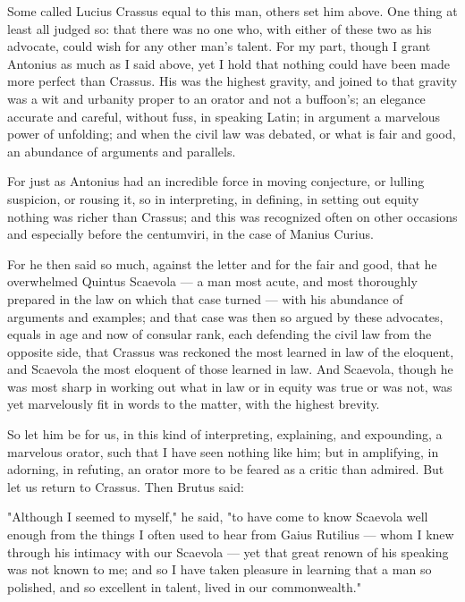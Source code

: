  Some called Lucius Crassus equal to this man, others set him above. One thing at least all judged so: that there was no one who, with either of these two as his advocate, could wish for any other man's talent. For my part, though I grant Antonius as much as I said above, yet I hold that nothing could have been made more perfect than Crassus. His was the highest gravity, and joined to that gravity was a wit and urbanity proper to an orator and not a buffoon's; an elegance accurate and careful, without fuss, in speaking Latin; in argument a marvelous power of unfolding; and when the civil law was debated, or what is fair and good, an abundance of arguments and parallels.

 For just as Antonius had an incredible force in moving conjecture, or lulling suspicion, or rousing it, so in interpreting, in defining, in setting out equity nothing was richer than Crassus; and this was recognized often on other occasions and especially before the centumviri, in the case of Manius Curius.

 For he then said so much, against the letter and for the fair and good, that he overwhelmed Quintus Scaevola — a man most acute, and most thoroughly prepared in the law on which that case turned — with his abundance of arguments and examples; and that case was then so argued by these advocates, equals in age and now of consular rank, each defending the civil law from the opposite side, that Crassus was reckoned the most learned in law of the eloquent, and Scaevola the most eloquent of those learned in law. And Scaevola, though he was most sharp in working out what in law or in equity was true or was not, was yet marvelously fit in words to the matter, with the highest brevity.

 So let him be for us, in this kind of interpreting, explaining, and expounding, a marvelous orator, such that I have seen nothing like him; but in amplifying, in adorning, in refuting, an orator more to be feared as a critic than admired. But let us return to Crassus. Then Brutus said:

 "Although I seemed to myself," he said, "to have come to know Scaevola well enough from the things I often used to hear from Gaius Rutilius — whom I knew through his intimacy with our Scaevola — yet that great renown of his speaking was not known to me; and so I have taken pleasure in learning that a man so polished, and so excellent in talent, lived in our commonwealth."

